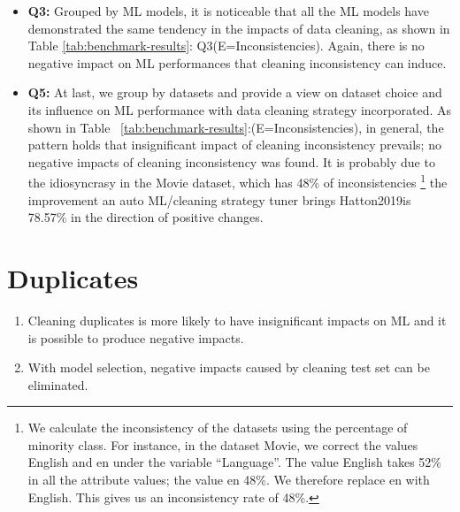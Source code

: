 \begin{itemize}
	\item {
		\textbf{Q3:} Grouped by ML models, it is noticeable that all the ML models have demonstrated the same tendency in the impacts of data
		cleaning, as shown in Table \ref{tab:benchmark-results}: Q3(E=Inconsistencies). Again, there is no negative impact on ML performances that cleaning inconsistency can induce.
	}

	\item {
		\textbf{Q5:} At last, we group by datasets and provide a view on dataset
		choice and its influence on ML performance with data cleaning strategy incorporated. As shown in Table ~\ref{tab:benchmark-results}:(E=Inconsistencies),
		in general, the pattern holds that insignificant impact of cleaning inconsistency prevails; no negative impacts of cleaning inconsistency
		was found. It is probably due to the idiosyncrasy in the Movie
		dataset, which has 48\% of inconsistencies \footnote{We calculate the inconsistency of the datasets using the percentage of minority class. For instance, in the dataset Movie, we correct the values English and en under the variable “Language”. The value English takes 52\% in all the attribute values; the value en 48\%. We therefore replace en with English. This gives us an inconsistency rate of 48\%.} the improvement an auto ML/cleaning strategy tuner brings Hatton2019is 78.57\% in the direction of positive changes.
	}
\end{itemize}

\section{Duplicates} \label{sec:duplicates}

\begin{enumerate}
	\item {
		Cleaning duplicates is more likely to have insignificant
		impacts on ML and it is possible to produce negative impacts.
	}
	\item {
		With model selection, negative impacts caused by
		cleaning test set can be eliminated.
	}
\end{enumerate}

